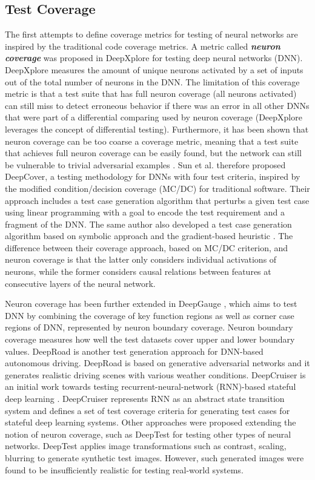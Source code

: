 \documentclass[letterpaper]{article} %
\begin{document}
\subsection{Test Coverage}
The first attempts to define coverage metrics for testing of neural networks are inspired by the traditional code coverage metrics. A metric called \textit{\textbf{neuron coverage}} was proposed in DeepXplore \cite{Pei2017} for testing deep neural networks (DNN). DeepXplore measures the amount of unique neurons activated by a set of inputs out of the total number of neurons in the DNN. The limitation of this coverage metric is that a test suite that has full neuron coverage (all neurons activated) can still miss to detect erroneous behavior if there was an error in all other DNNs that were part of a differential comparing \cite{Pei2017} used by neuron coverage (DeepXplore leverages the concept of differential testing). Furthermore, it has been shown that neuron coverage can be too coarse a coverage metric, meaning that a test suite that achieves full neuron coverage can be easily found, but the network can still be vulnerable to trivial adversarial examples \cite{Sun2018a}. Sun et al. therefore proposed DeepCover, a testing methodology for DNNs with four test criteria, inspired by the modified condition/decision coverage (MC/DC) for traditional software. Their approach includes a test case generation algorithm that perturbs a given test case using linear programming with a goal to encode the test requirement and a fragment of the DNN. The same author also developed a test case generation algorithm based on symbolic approach and the gradient-based heuristic \cite{Sun2018b}. The difference between their coverage approach, based on MC/DC criterion, and neuron coverage is that the latter only considers individual activations of neurons, while the former considers causal relations between features at consecutive layers of the neural network. 

Neuron coverage has been further extended in DeepGauge \cite{Ma2018}, which aims to test DNN by combining the coverage of key function regions as well as corner case regions of DNN, represented by neuron boundary coverage. Neuron boundary coverage measures how well the test datasets cover upper and lower boundary values. DeepRoad \cite{Zhang2018} is another test generation approach for DNN-based autonomous driving. DeepRoad is based on generative adversarial networks and it generates realistic driving scenes with various weather conditions. DeepCruiser is an initial work towards testing recurrent-neural-network (RNN)-based stateful deep learning \cite{Du2018}. DeepCruiser represents RNN as an abstract state transition system and defines a set of test coverage criteria for generating test cases for stateful deep learning systems. Other approaches were proposed extending the notion of neuron coverage, such as DeepTest \cite{Tian2018} for testing other types of neural networks. DeepTest applies image transformations such as contrast, scaling, blurring to generate synthetic test images. However, such generated images were found to be insufficiently realistic for testing real-world systems.
\end{document}

